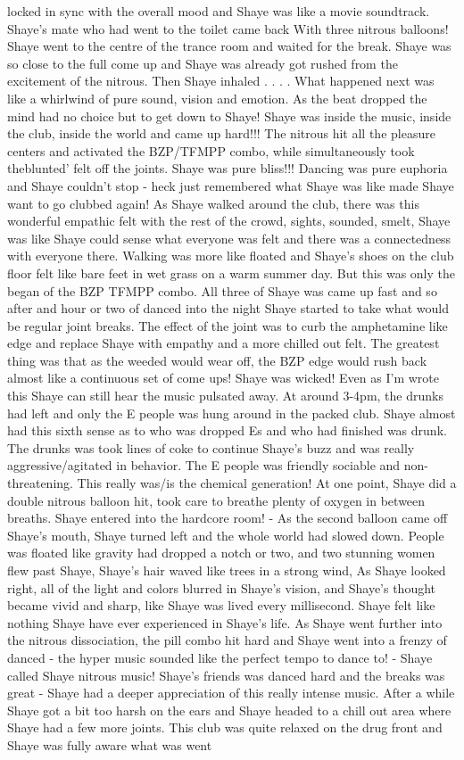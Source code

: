 \documentclass[12pt]{book}
\begin{document}
locked in sync with the overall mood and Shaye was like a movie soundtrack. Shaye's mate who had went to the toilet came back With three nitrous balloons! Shaye went to the centre of the trance room and waited for the break. Shaye was so close to the full come up and Shaye was already got rushed from the excitement of the nitrous. Then Shaye inhaled . . .  . What happened next was like a whirlwind of pure sound, vision and emotion. As the beat dropped the mind had no choice but to get down to Shaye! Shaye was inside the music, inside the club, inside the world and came up hard!!! The nitrous hit all the pleasure centers and activated the BZP/TFMPP combo, while simultaneously took theblunted' felt off the joints. Shaye was pure bliss!!! Dancing was pure euphoria and Shaye couldn't stop - heck just remembered what Shaye was like made Shaye want to go clubbed again! As Shaye walked around the club, there was this wonderful empathic felt with the rest of the crowd, sights, sounded, smelt, Shaye was like Shaye could sense what everyone was felt and there was a connectedness with everyone there. Walking was more like floated and Shaye's shoes on the club floor felt like bare feet in wet grass on a warm summer day. But this was only the began of the BZP TFMPP combo. All three of Shaye was came up fast and so after and hour or two of danced into the night Shaye started to take what would be regular joint breaks. The effect of the joint was to curb the amphetamine like edge and replace Shaye with empathy and a more chilled out felt. The greatest thing was that as the weeded would wear off, the BZP edge would rush back almost like a continuous set of come ups! Shaye was wicked! Even as I'm wrote this Shaye can still hear the music pulsated away. At around 3-4pm, the drunks had left and only the E people was hung around in the packed club. Shaye almost had this sixth sense as to who was dropped Es and who had finished was drunk. The drunks was took lines of coke to continue Shaye's buzz and was really aggressive/agitated in behavior. The E people was friendly sociable and non-threatening. This really was/is the chemical generation! At one point, Shaye did a double nitrous balloon hit, took care to breathe plenty of oxygen in between breaths. Shaye entered into the hardcore room! - As the second balloon came off Shaye's mouth, Shaye turned left and the whole world had slowed down. People was floated like gravity had dropped a notch or two, and two stunning women flew past Shaye, Shaye's hair waved like trees in a strong wind, As Shaye looked right, all of the light and colors blurred in Shaye's vision, and Shaye's thought became vivid and sharp, like Shaye was lived every millisecond. Shaye felt like nothing Shaye have ever experienced in Shaye's life. As Shaye went further into the nitrous dissociation, the pill combo hit hard and Shaye went into a frenzy of danced - the hyper music sounded like the perfect tempo to dance to! - Shaye called Shaye nitrous music! Shaye's friends was danced hard and the breaks was great - Shaye had a deeper appreciation of this really intense music. After a while Shaye got a bit too harsh on the ears and Shaye headed to a chill out area where Shaye had a few more joints. This club was quite relaxed on the drug front and Shaye was fully aware what was went 
\end{document}
